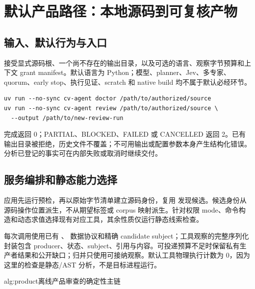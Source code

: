\section{默认产品路径：本地源码到可复核产物}
\label{sec:product}
\subsection{输入、默认行为与入口}
 接受显式源码根、一个尚不存在的输出目录，以及可选的语言、观察字节预算和上下文 grant manifest。默认语言为 Python；模型、planner、Jev、多专家、quorum、early stop、执行见证、scratch 和 native build 均不属于默认必经环节。

\begin{lstlisting}[caption={默认静态入口；路径由使用者明确选择，输出目录不得已经存在。}]
uv run --no-sync cv-agent doctor /path/to/authorized/source
uv run --no-sync cv-agent review /path/to/authorized/source \
  --output /path/to/new-review-run
\end{lstlisting}
完成返回 0；PARTIAL、BLOCKED、FAILED 或 CANCELLED 返回 2。已有输出目录被拒绝，历史文件不覆盖；不可用输出或配置参数本身产生结构化错误。分析已登记的事实可在内部失败或取消时继续交付。

\subsection{服务编排和静态能力选择}
应用先运行预检，再以原始字节清单建立源码身份，复用  发现候选。候选身份从源码操作位置派生，不从期望标签或 corpus 映射派生。针对权限 mode、命令构造和动态求值选择现有对应工具，其余性质仅运行静态线索检查。

每次调用使用已有 、 数据协议和精确 candidate subject；工具观察的完整序列化封装包含 producer、状态、subject、引用与内容。可投递预算不足时保留私有生产者结果和公开缺口；归并只使用可接纳观察。默认工具物理执行计数为 0，因为这里的检查是静态/AST 分析，不是目标进程运行。

\begin{pseudocode}{alg:product}{离线产品审查的确定性主链}
\end{pseudocode}

